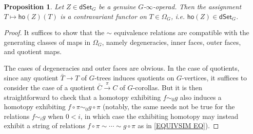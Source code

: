 \documentclass[a4paper,10pt]{article}%
\numberwithin{equation}{section}
\numberwithin{figure}{section}
\newtheorem{proposition}[equation]{Proposition}%
\theoremstyle{definition} %
\newcommand{\1}{\ensuremath{\mathbbm 1}}%
\begin{document}
\begin{proposition}
	Let $Z \in \mathsf{dSet}_G$ be a genuine $G$-$\infty$-operad. Then the assignment 
	$T \mapsto \mathsf{ho}(Z)(T)$
	is a contravariant functor on $T \in \Omega_G$, i.e.
	$\mathsf{ho}(Z) \in \mathsf{dSet}_G$.
\end{proposition}

\begin{proof}
	It suffices to show that the $\sim$ equivalence relations are compatible with the generating classes of maps in $\Omega_G$, namely
	degeneracies, inner faces, outer faces, and quotient maps.
	
	The cases of degeneracies and outer faces are obvious. In the case of quotients, 
	since any quotient $\bar{T} \to T$ of $G$-trees induces quotients on $G$-vertices, it suffices to consider the case of a quotient
	$\bar{C} \xrightarrow{\pi} C$ of $G$-corollas.
	But it is then straightforward to check that a homotopy exhibiting $f \sim_0 g$ also induces a homotopy exhibiting 
	$f \circ \pi \sim_0 g \circ \pi$
	(notably, the same needs not be true for the relations $f \sim_i g$ when $0<i$, 
	in which case the exhibiting homotopy 
	may instead exhibit a string of relations 
	$f \circ \pi \sim \cdots \sim g \circ \pi$
	as in \eqref{EQUIVSIM EQ}).


\end{proof}
\end{document}
